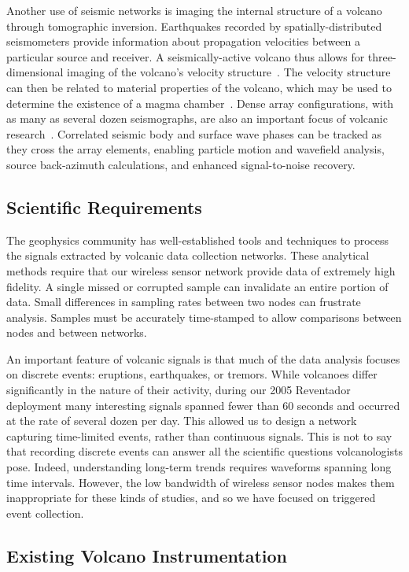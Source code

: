Another use of seismic networks is imaging the internal structure of a
volcano through tomographic inversion. Earthquakes recorded by
spatially-distributed seismometers provide information about propagation
velocities between a particular source and receiver. A seismically-active
volcano thus allows for three-dimensional imaging of the volcano's velocity
structure~\cite{Benz96,Phillips91}. The velocity structure can then be
related to material properties of the volcano, which may be used to determine
the existence of a magma chamber~\cite{Lees89,Moran99}. Dense array
configurations, with as many as several dozen seismographs, are also an
important focus of volcanic research~\cite{Dietel89,Neuberg94}. Correlated
seismic body and surface wave phases can be tracked as they cross the array
elements, enabling particle motion and wavefield analysis, source
back-azimuth calculations, and enhanced signal-to-noise recovery.

\subsection{Scientific Requirements}

The geophysics community has well-established tools and techniques to process
the signals extracted by volcanic data collection networks. These analytical
methods require that our wireless sensor network provide data of extremely
high fidelity. A single missed or corrupted sample can invalidate an entire
portion of data. Small differences in sampling rates between two nodes can
frustrate analysis. Samples must be accurately time-stamped to allow
comparisons between nodes and between networks.

An important feature of volcanic signals is that much of the data analysis
focuses on discrete events: eruptions, earthquakes, or tremors. While
volcanoes differ significantly in the nature of their activity, during our
2005 Reventador deployment many interesting signals spanned fewer than 60
seconds and occurred at the rate of several dozen per day. This allowed us to
design a network capturing time-limited events, rather than continuous
signals. This is not to say that recording discrete events can answer all the
scientific questions volcanologists pose. Indeed, understanding long-term
trends requires waveforms spanning long time intervals. However, the low
bandwidth of wireless sensor nodes makes them inappropriate for these kinds
of studies, and so we have focused on triggered event collection.

\subsection{Existing Volcano Instrumentation}

